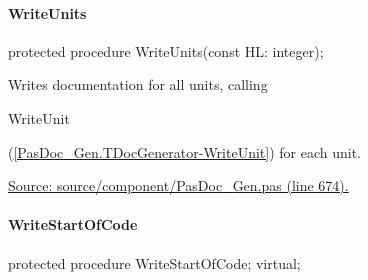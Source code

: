 \documentclass{report}
\newif\ifpdf
\begin{document}
\paragraph*{WriteUnits}\hspace*{\fill}

\label{PasDoc_Gen.TDocGenerator-WriteUnits}
\begin{list}{}{
\setlength{\itemindent}{0cm}
\setlength{\listparindent}{0cm}
\setlength{\leftmargin}{\evensidemargin}
\addtolength{\leftmargin}{\tmplength}
\settowidth{\labelsep}{X}
\addtolength{\leftmargin}{\labelsep}
\setlength{\labelwidth}{\tmplength}
}
\item[\textbf{Declaration}\hfill]
\ifpdf
\begin{flushleft}
\fi
\begin{ttfamily}
protected procedure WriteUnits(const HL: integer);\end{ttfamily}

\ifpdf
\end{flushleft}
\fi

\par
\item[\textbf{Description}]
Writes documentation for all units, calling \begin{ttfamily}WriteUnit\end{ttfamily}(\ref{PasDoc_Gen.TDocGenerator-WriteUnit}) for each unit.\par
\href{https://github.com/pasdoc/pasdoc/blob/master/source/component/PasDoc_Gen.pas#L674}{Source: source/component/PasDoc{\_}Gen.pas (line 674).}

\end{list}
\paragraph*{WriteStartOfCode}\hspace*{\fill}

\label{PasDoc_Gen.TDocGenerator-WriteStartOfCode}
\begin{list}{}{
\setlength{\itemindent}{0cm}
\setlength{\listparindent}{0cm}
\setlength{\leftmargin}{\evensidemargin}
\addtolength{\leftmargin}{\tmplength}
\settowidth{\labelsep}{X}
\addtolength{\leftmargin}{\labelsep}
\setlength{\labelwidth}{\tmplength}
}
\item[\textbf{Declaration}\hfill]
\ifpdf
\begin{flushleft}
\fi
\begin{ttfamily}
protected procedure WriteStartOfCode; virtual;\end{ttfamily}

\ifpdf
\end{flushleft}
\fi

\end{list}
\end{document}
